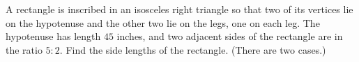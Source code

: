 A rectangle is inscribed in an isosceles right triangle so that two of its vertices lie on the hypotenuse and the other two lie on the legs, one on each leg. The hypotenuse has length $45$ inches, and two adjacent sides of the rectangle are in the ratio $5:2$. Find the side lengths of the rectangle. (There are two cases.)

